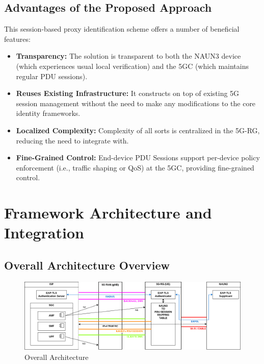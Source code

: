 \subsection{Advantages of the Proposed Approach}

This session-based proxy identification scheme offers a number of beneficial features:

\begin{itemize}
    \item \textbf{Transparency:} The solution is transparent to both the \ac{NAUN3} device (which experiences usual local verification) and the \ac{5GC} (which maintains regular \ac{PDU} sessions).
    \item \textbf{Reuses Existing Infrastructure:} It constructs on top of existing \ac{5G} session management without the need to make any modifications to the core identity frameworks.

    \item \textbf{Localized Complexity:} Complexity of all sorts is centralized in the \ac{5G-RG}, reducing the need to integrate with.
    
    \item \textbf{Fine-Grained Control:} End-device \ac{PDU} Sessions support per-device policy enforcement (i.e., traffic shaping or \ac{QoS}) at the \ac{5GC}, providing fine-grained control.
\end{itemize}

\section{Framework Architecture and Integration}

\subsection{Overall Architecture Overview}

\begin{figure}
    \centering
    \includegraphics[width=1\linewidth]{figs/overall-topology.png}
    \caption{Overall Architecture}
    \label{fig:Overall Architecture}
\end{figure}

